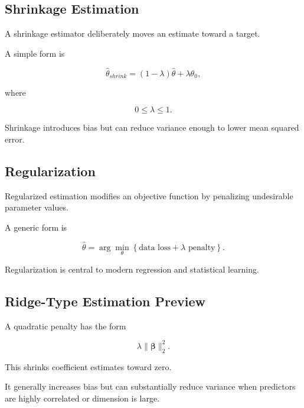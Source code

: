 \subsection{Shrinkage Estimation}
\label{subsec:shrinkage-estimation}

A shrinkage estimator deliberately moves an estimate toward a target.

A simple form is

\[
\boxed{
\widehat{\theta}_{shrink}
=
(1-\lambda)
\widehat{\theta}
+
\lambda\theta_0,
}
\]

where

\[
0\leq\lambda\leq1.
\]

Shrinkage introduces bias but can reduce variance enough to lower mean
squared error.

\subsection{Regularization}
\label{subsec:regularization-estimation}

Regularized estimation modifies an objective function by penalizing
undesirable parameter values.

A generic form is

\[
\boxed{
\widehat{\theta}
=
\arg\min_\theta
\left\{
\text{data loss}
+
\lambda
\text{ penalty}
\right\}.
}
\]

Regularization is central to modern regression and statistical learning.

\subsection{Ridge-Type Estimation Preview}
\label{subsec:ridge-preview-estimation}

A quadratic penalty has the form

\[
\boxed{
\lambda
\|\boldsymbol{\beta}\|_2^2.
}
\]

This shrinks coefficient estimates toward zero.

It generally increases bias but can substantially reduce variance when
predictors are highly correlated or dimension is large.

